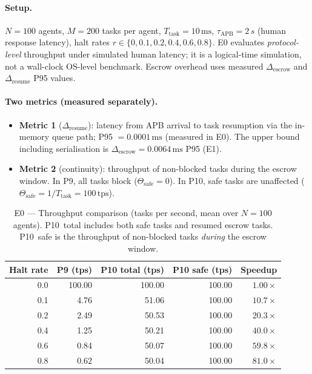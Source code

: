 \documentclass[11pt]{article}
\newcommand{\Drescrow}{\Delta_{\mathrm{escrow}}}
\newcommand{\Dresume}{\Delta_{\mathrm{resume}}}
\begin{document}
\paragraph{Setup.}
$N=100$ agents, $M=200$ tasks per agent, $T_{\mathrm{task}}=10\,\si{\milli\second}$,
$\tau_{\mathrm{APB}}=2\,\si{s}$ (human response latency), halt rates
$r \in \{0, 0.1, 0.2, 0.4, 0.6, 0.8\}$. E0 evaluates
\emph{protocol-level} throughput under simulated human latency; it is
a logical-time simulation, not a wall-clock OS-level benchmark.
Escrow overhead uses measured $\Drescrow$ and $\Dresume$ P95 values.

\paragraph{Two metrics (measured separately).}
\begin{itemize}[itemsep=2pt]
  \item \textbf{Metric 1} ($\Dresume$): latency from APB arrival to
    task resumption via the in-memory queue path; P95
    $= 0.0001\,\si{\milli\second}$ (measured in E0). The upper bound
    including serialisation is $\Drescrow = 0.0064\,\si{\milli\second}$
    P95 (E1).
  \item \textbf{Metric 2} (continuity): throughput of non-blocked tasks
    during the escrow window. In P9, all tasks block ($\Theta_{\mathrm{safe}}
    = 0$). In P10, safe tasks are unaffected ($\Theta_{\mathrm{safe}} =
    1/T_{\mathrm{task}} = 100\,\text{tps}$).
\end{itemize}

\begin{table}[h]
\centering
\caption{E0 --- Throughput comparison (tasks per second, mean over $N=100$ agents).
P10~total includes both safe tasks and resumed escrow tasks.
P10~safe is the throughput of non-blocked tasks \emph{during} the escrow window.}
\label{tab:e0}
\begin{tabular}{rrrrr}
\toprule
Halt rate & P9 (tps) & P10 total (tps) & P10 safe (tps) & Speedup \\
\midrule
0.0 & 100.00 & 100.00 & 100.00 & $1.00\times$ \\
0.1 &   4.76 &  51.06 & 100.00 & $10.7\times$ \\
0.2 &   2.49 &  50.53 & 100.00 & $20.3\times$ \\
0.4 &   1.25 &  50.21 & 100.00 & $40.0\times$ \\
0.6 &   0.84 &  50.07 & 100.00 & $59.8\times$ \\
0.8 &   0.62 &  50.04 & 100.00 & $81.0\times$ \\
\bottomrule
\end{tabular}
\end{table}
\end{document}
